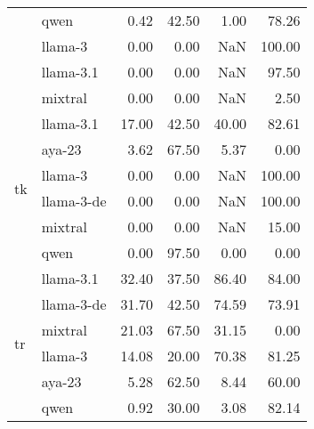\begin{tabular}{llrrrr}
 & qwen & 0.42 & 42.50 & 1.00 & 78.26 \\
 & llama-3 & 0.00 & 0.00 & NaN & 100.00 \\
 & llama-3.1 & 0.00 & 0.00 & NaN & 97.50 \\
 & mixtral & 0.00 & 0.00 & NaN & 2.50 \\
\cline{1-6}
\multirow[t]{6}{*}{tk} & llama-3.1 & 17.00 & 42.50 & 40.00 & 82.61 \\
 & aya-23 & 3.62 & 67.50 & 5.37 & 0.00 \\
 & llama-3 & 0.00 & 0.00 & NaN & 100.00 \\
 & llama-3-de & 0.00 & 0.00 & NaN & 100.00 \\
 & mixtral & 0.00 & 0.00 & NaN & 15.00 \\
 & qwen & 0.00 & 97.50 & 0.00 & 0.00 \\
\cline{1-6}
\multirow[t]{6}{*}{tr} & llama-3.1 & 32.40 & 37.50 & 86.40 & 84.00 \\
 & llama-3-de & 31.70 & 42.50 & 74.59 & 73.91 \\
 & mixtral & 21.03 & 67.50 & 31.15 & 0.00 \\
 & llama-3 & 14.08 & 20.00 & 70.38 & 81.25 \\
 & aya-23 & 5.28 & 62.50 & 8.44 & 60.00 \\
 & qwen & 0.92 & 30.00 & 3.08 & 82.14 \\
\cline{1-6}
\bottomrule
\end{tabular}
